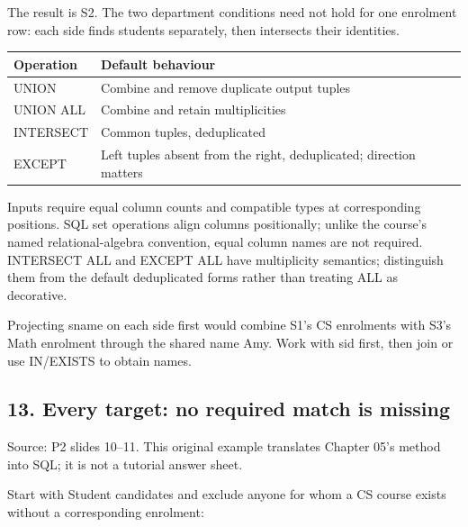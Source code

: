 The result is S2. The two department conditions need not hold for one enrolment row: each side finds students separately, then intersects their identities.

\begin{longtable}[]{@{}
  >{\raggedright\arraybackslash}p{}
  >{\raggedright\arraybackslash}p{}@{}}
\toprule\noalign{}
\begin{minipage}[b]{\linewidth}\raggedright
Operation
\end{minipage} & \begin{minipage}[b]{\linewidth}\raggedright
Default behaviour
\end{minipage} \\
\midrule\noalign{}
\endhead
\bottomrule\noalign{}
\endlastfoot
UNION & Combine and remove duplicate output tuples \\
UNION ALL & Combine and retain multiplicities \\
INTERSECT & Common tuples, deduplicated \\
EXCEPT & Left tuples absent from the right, deduplicated; direction matters \\
\end{longtable}

Inputs require equal column counts and compatible types at corresponding positions. SQL set operations align columns positionally; unlike the course's named relational-algebra convention, equal column names are not required. INTERSECT ALL and EXCEPT ALL have multiplicity semantics; distinguish them from the default deduplicated forms rather than treating ALL as decorative.

Projecting sname on each side first would combine S1's CS enrolments with S3's Math enrolment through the shared name Amy. Work with sid first, then join or use IN/EXISTS to obtain names.

\subsection{13. Every target: no required match is missing}\label{06_sql_queries_en-every-target-no-required-match-is-missing}

Source: P2 slides 10--11. This original example translates Chapter 05's method into SQL; it is not a tutorial answer sheet.

Start with Student candidates and exclude anyone for whom a CS course exists without a corresponding enrolment:

